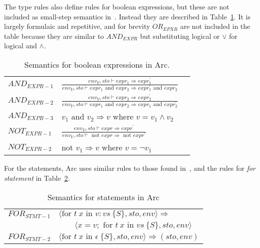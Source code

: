 The type rules also define rules for boolean expressions, but these are not included as small-step semantics in~\cite{Huttel2010}. Instead they are described in Table~\ref{tab:booleansemantics}. It is largely formulaic and repetitive, and for brevity $OR_{EPXR}$ are not included in the table because they are similar to $AND_{EXPR}$ but substituting logical or $\lor$ for logical and $\land$.


\begin{table}[htb!]
    \centering
    \begin{tabular}{lll}
        \toprule
        $AND_{EXPR-1}$ & $\frac
            {env_V, sto \vdash expr_1 \Rightarrow expr^\prime_1}
            {env_V, sto \vdash expr_1 \text{ and } expr_2 \Rightarrow expr^\prime_1 \text{ and } expr_2}$ \\ [12pt]
        $AND_{EXPR-2}$ & $\frac
            {env_V, sto \vdash expr_2 \Rightarrow expr^\prime_2}
            {env_V, sto \vdash expr_1 \text{ and } expr_2 \Rightarrow expr_1 \text{ and } expr^\prime_2}$ \\ [12pt]
        $AND_{EXPR-3}$ & $v_1 \text{ and } v_2 \Rightarrow v$ where $ v = v_1 \land v_2$                  \\ [12pt]
        $NOT_{EXPR-1}$ & $\frac
            {env_V, sto \vdash expr \Rightarrow expr^\prime}
            {env_V, sto \vdash \text{ not } expr \Rightarrow \text{ not } expr^\prime}$                   \\ [12pt]
        $NOT_{EXPR-2}$ & $\text{not } v_1 \Rightarrow v$ where $v = \neg v_1 $                            \\
        \bottomrule
    \end{tabular}
    \caption{Semantics for boolean expressions in Arc.}
    \label{tab:booleansemantics}
\end{table}


For the statements, Arc uses similar rules to those found in~\cite[Ch.~10]{Huttel2010}, and the rules for \textit{for statement} in Table~\ref{tab:statementsemantics}.


\begin{table}[htb!]
    \centering
    \begin{tabular}{ll}
        \toprule
        $FOR_{STMT-1}$ & $\langle \text{for } t \ x \text{ in } v : vs \ \{ S \}, sto, env \rangle \Rightarrow$               \\
                       & $\qquad \langle x = v; \text{ for } t \ x \text{ in } vs \ \{ S \}, sto, env \rangle$                \\[12pt]
        $FOR_{STMT-2}$ & $\langle \text{for } t \ x \text{ in } \epsilon \ \{ S \}, sto, env \rangle \Rightarrow (sto, env) $ \\
        \bottomrule
    \end{tabular}
    \caption{Semantics for statements in Arc}
    \label{tab:statementsemantics}
\end{table}

